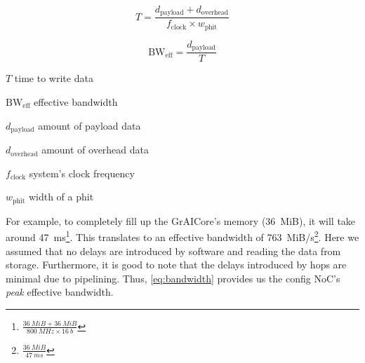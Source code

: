 \begin{equation}
    T = 
    \frac{d_{\text{payload}} + d_{\text{overhead}}}
    {f_{\text{clock}} \times w_{\text{phit}}}
\label{eq:latency}
\end{equation}

\begin{equation}
    \text{BW}_{\text{eff}} =
    \frac{d_\text{payload}}{T}
\label{eq:bandwidth}
\end{equation}

\begin{eqexpl}[15mm]
    \item{$T$} time to write data
    \item{$\text{BW}_{\text{eff}}$} effective bandwidth
    \item{$d_{\text{payload}}$} amount of payload data
    \item{$d_{\text{overhead}}$} amount of overhead data
    \item{$f_{\text{clock}}$} system's clock frequency
    \item{$w_{\text{phit}}$} width of a phit
\end{eqexpl}

For example, to completely fill up the GrAICore's memory (\SI{36}{MiB}), it will take around \SI{47}{ms}\footnote{$\frac{\SI{36}{MiB} + \SI{36}{MiB}}{\SI{800}{MHz} \times \SI{16}{b}}$}.
This translates to an effective bandwidth of \SI{763}{MiB/s}\footnote{$\frac{\SI{36}{MiB}}{\SI{47}{ms}}$}.
Here we assumed that no delays are introduced by software and reading the data from storage.
Furthermore, it is good to note that the delays introduced by hops are minimal due to pipelining.
Thus, \cref{eq:bandwidth} provides us the config NoC's \textit{peak} effective bandwidth.